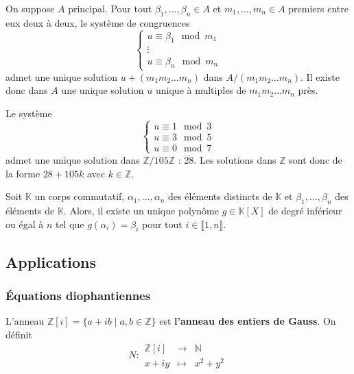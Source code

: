 	\begin{corollary}
		On suppose $A$ principal. Pour tout $\beta_1, \dots, \beta_n \in A$ et $m_1, \dots, m_n \in A$ premiers entre eux deux à deux, le système de congruences
		\[
			\begin{cases}
				u \equiv \beta_1 \mod m_1 \\
				\vdots \\
				u \equiv \beta_n \mod m_n
			\end{cases}
		\]
		admet une unique solution $u + (m_1 m_2 \dots m_n)$ dans $A / (m_1 m_2 \dots m_n)$. Il existe donc dans $A$ une unique solution $u$ unique à multiples de $m_1 m_2 \dots m_n$ près.
	\end{corollary}
	
	\begin{example}
		Le système
		\[
			\begin{cases}
				u \equiv 1 \mod 3 \\
				u \equiv 3 \mod 5 \\
				u \equiv 0 \mod 7
			\end{cases}
		\]
		admet une unique solution dans $\mathbb{Z}/105\mathbb{Z}$ : $\overline{28}$. Les solutions dans $\mathbb{Z}$ sont donc de la forme $28 + 105k$ avec $k \in \mathbb{Z}$.
	\end{example}
	
	\begin{application}
		Soit $\mathbb{K}$ un corps commutatif, $\alpha_1, \dots, \alpha_n$ des éléments distincts de $\mathbb{K}$ et $\beta_1, \dots, \beta_n$ des éléments de $\mathbb{K}$. Alors, il existe un unique polynôme $g \in \mathbb{K}[X]$ de degré inférieur ou égal à $n$ tel que $g(\alpha_i) = \beta_i$ pour tout $i \in \llbracket 1, n \rrbracket$.
	\end{application}
	
	\subsection{Applications}
	
	\subsubsection{Équations diophantiennes}
	
	
	\begin{definition}
		L'anneau $\mathbb{Z}[i] = \{ a + ib \mid a, b \in \mathbb{Z} \}$ est \textbf{l'anneau des entiers de Gauss}. On définit
		\[
			N :
			\begin{array}{ccc}
				\mathbb{Z}[i] &\rightarrow& \mathbb{N} \\
				x+iy &\mapsto& x^2 + y^2
			\end{array}
		\]
	\end{definition}
	
